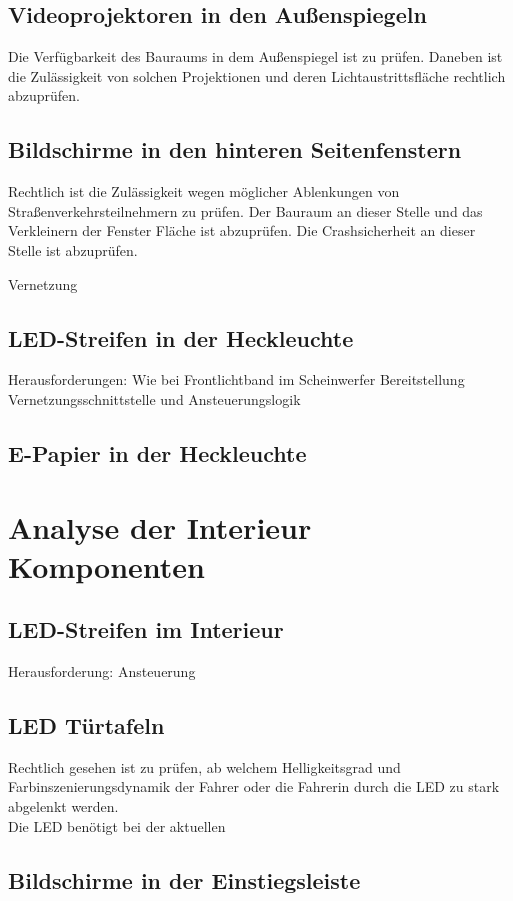 \subsection{Videoprojektoren in den Außenspiegeln}
Die Verfügbarkeit des Bauraums in dem Außenspiegel ist zu prüfen. Daneben ist die Zulässigkeit von solchen Projektionen und deren Lichtaustrittsfläche rechtlich abzuprüfen.
\subsection{Bildschirme in den hinteren Seitenfenstern}
Rechtlich ist die Zulässigkeit wegen möglicher Ablenkungen von Straßenverkehrsteilnehmern zu prüfen.
Der Bauraum an dieser Stelle und das Verkleinern der Fenster Fläche ist abzuprüfen.
Die Crashsicherheit an dieser Stelle ist abzuprüfen.

Vernetzung
\subsection{LED-Streifen in der Heckleuchte}
Herausforderungen:
Wie bei Frontlichtband im Scheinwerfer
Bereitstellung Vernetzungsschnittstelle und Ansteuerungslogik

\subsection{E-Papier in der Heckleuchte}

\section{Analyse der Interieur Komponenten}
\subsection{LED-Streifen im Interieur}
Herausforderung:
Ansteuerung
\subsection{LED Türtafeln}
Rechtlich gesehen ist zu prüfen, ab welchem Helligkeitsgrad und Farbinszenierungsdynamik der Fahrer oder die Fahrerin durch die LED zu stark abgelenkt werden.\\
Die LED benötigt bei der aktuellen 
\subsection{Bildschirme in der Einstiegsleiste}

